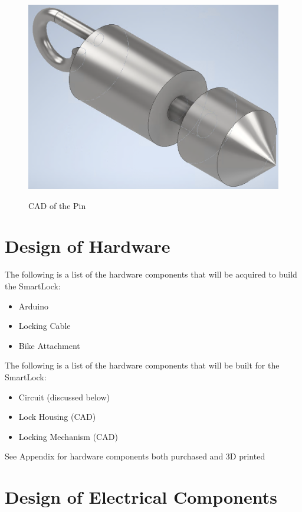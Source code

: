 \documentclass[12pt, titlepage]{article}
\begin{document}
  \begin{figure}[h!]
 \begin{center}
 {
  \includegraphics[width=0.32\linewidth]{12.png}
 }
 \caption{\label{CAD of the Pin} CAD of the Pin}
 \end{center}
 \end{figure}


\newpage
\section{Design of Hardware}

The following is a list of the hardware components that will be acquired to build the SmartLock:
\begin{itemize}
\item Arduino
\item Locking Cable
\item Bike Attachment
\end{itemize}

The following is a list of the hardware components that will be built for the SmartLock:
\begin{itemize}
\item Circuit (discussed below)
\item Lock Housing (CAD)
\item Locking Mechanism (CAD)
\end{itemize}

See Appendix for hardware components both purchased and 3D printed


\section{Design of Electrical Components}
\end{document}

